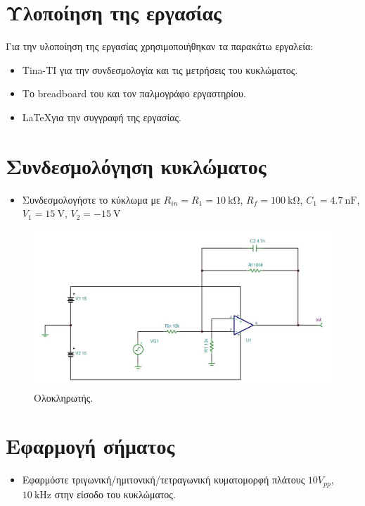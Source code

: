 \documentclass[12pt]{article}
\begin{document}
\section{Υλοποίηση της εργασίας}

Για την υλοποίηση της εργασίας χρησιμοποιήθηκαν τα παρακάτω εργαλεία:
\begin{itemize}
	\item Tina-TI για την συνδεσμολογία και τις μετρήσεις του κυκλώματος.
	\item Το breadboard του και τον παλμογράφο εργαστηρίου.
	\item \LaTeX για την συγγραφή της εργασίας.
\end{itemize}

\section{Συνδεσμολόγηση κυκλώματος}

\begin{itemize}
	\item Συνδεσμολογήστε το κύκλωμα με $R_{in} = R_1= \SI{10}{\kohm}$,
		$R_f = \SI{100}{\kohm}$, $C_1 = \SI{4.7}{\nano\farad}$,
		$V_1 = \SI{15}{\volt}$, $V_2 = \SI{-15}{\volt}$
\end{itemize}

\begin{figure}[H]
	\centering
	\includegraphics[width=\linewidth]{./res/schem.jpg}
	\caption{Ολοκληρωτής.}
\end{figure}

\section{Εφαρμογή σήματος}

\begin{itemize}
	\item Εφαρμόστε τριγωνική/ημιτονική/τετραγωνική κυματομορφή πλάτους
		$10V_{pp}$, $\SI{10}{\kilo\hertz}$ στην είσοδο του κυκλώματος.
\end{itemize}
\end{document}
